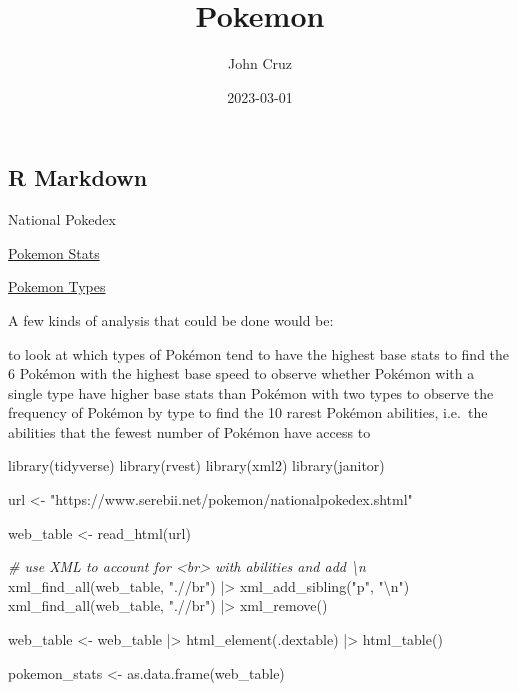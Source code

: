 \documentclass[
]{article}
\title{Pokemon}
\author{John Cruz}
\date{2023-03-01}
\newenvironment{Shaded}{\begin{snugshade}}{\end{snugshade}}
\newcommand{\CommentTok}[1]{\textcolor[rgb]{0.56,0.35,0.01}{\textit{#1}}}
\newcommand{\FunctionTok}[1]{\textcolor[rgb]{0.00,0.00,0.00}{#1}}
\newcommand{\NormalTok}[1]{#1}
\newcommand{\OtherTok}[1]{\textcolor[rgb]{0.56,0.35,0.01}{#1}}
\newcommand{\SpecialCharTok}[1]{\textcolor[rgb]{0.00,0.00,0.00}{#1}}
\newcommand{\StringTok}[1]{\textcolor[rgb]{0.31,0.60,0.02}{#1}}
\begin{document}
\maketitle

\hypertarget{r-markdown}{%
\subsection{R Markdown}\label{r-markdown}}

National Pokedex

\href{https://www.serebii.net/pokemon/nationalpokedex.shtml}{Pokemon
Stats}

\href{https://m.bulbapedia.bulbagarden.net/wiki/List_of_Pok\%C3\%A9mon_by_National_Pok\%C3\%A9dex_number}{Pokemon
Types}

A few kinds of analysis that could be done would be:

to look at which types of Pokémon tend to have the highest base stats to
find the 6 Pokémon with the highest base speed to observe whether
Pokémon with a single type have higher base stats than Pokémon with two
types to observe the frequency of Pokémon by type to find the 10 rarest
Pokémon abilities, i.e.~the abilities that the fewest number of Pokémon
have access to

\begin{Shaded}
\begin{Highlighting}[]
\FunctionTok{library}\NormalTok{(tidyverse)}
\FunctionTok{library}\NormalTok{(rvest)}
\FunctionTok{library}\NormalTok{(xml2)}
\FunctionTok{library}\NormalTok{(janitor)}
\end{Highlighting}
\end{Shaded}

\begin{Shaded}
\begin{Highlighting}[]
\NormalTok{url }\OtherTok{\textless{}{-}} \StringTok{"https://www.serebii.net/pokemon/nationalpokedex.shtml"}

\NormalTok{web\_table }\OtherTok{\textless{}{-}} \FunctionTok{read\_html}\NormalTok{(url) }

\CommentTok{\# use XML to account for \textless{}br\textgreater{} with abilities and add \textquotesingle{}\textbackslash{}n\textquotesingle{}}
\FunctionTok{xml\_find\_all}\NormalTok{(web\_table, }\StringTok{".//br"}\NormalTok{) }\SpecialCharTok{|\textgreater{}} 
  \FunctionTok{xml\_add\_sibling}\NormalTok{(}\StringTok{"p"}\NormalTok{, }\StringTok{"}\SpecialCharTok{\textbackslash{}n}\StringTok{"}\NormalTok{)}
\FunctionTok{xml\_find\_all}\NormalTok{(web\_table, }\StringTok{".//br"}\NormalTok{) }\SpecialCharTok{|\textgreater{}} 
  \FunctionTok{xml\_remove}\NormalTok{() }

\NormalTok{web\_table }\OtherTok{\textless{}{-}} 
\NormalTok{  web\_table }\SpecialCharTok{|\textgreater{}} 
  \FunctionTok{html\_element}\NormalTok{(}\StringTok{\textquotesingle{}.dextable\textquotesingle{}}\NormalTok{) }\SpecialCharTok{|\textgreater{}} 
  \FunctionTok{html\_table}\NormalTok{()}

\NormalTok{pokemon\_stats }\OtherTok{\textless{}{-}} \FunctionTok{as.data.frame}\NormalTok{(web\_table)}
\end{Highlighting}
\end{Shaded}
\end{document}

